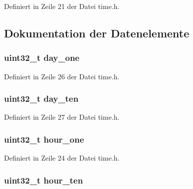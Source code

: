 Definiert in Zeile 21 der Datei time.\+h.



\subsection{Dokumentation der Datenelemente}
\hypertarget{structtime__date_aa49ac5f823611c03f3c3723f12047cfc}{}
\subsubsection[{day\+\_\+one}]{\setlength{\rightskip}{0pt plus 5cm}uint32\+\_\+t day\+\_\+one}\label{structtime__date_aa49ac5f823611c03f3c3723f12047cfc}


Definiert in Zeile 26 der Datei time.\+h.

\hypertarget{structtime__date_af252ce7a893acb93c32d07d0330f900d}{}
\subsubsection[{day\+\_\+ten}]{\setlength{\rightskip}{0pt plus 5cm}uint32\+\_\+t day\+\_\+ten}\label{structtime__date_af252ce7a893acb93c32d07d0330f900d}


Definiert in Zeile 27 der Datei time.\+h.

\hypertarget{structtime__date_a338fe5a5db873c63189f9c98bf0376fc}{}
\subsubsection[{hour\+\_\+one}]{\setlength{\rightskip}{0pt plus 5cm}uint32\+\_\+t hour\+\_\+one}\label{structtime__date_a338fe5a5db873c63189f9c98bf0376fc}


Definiert in Zeile 24 der Datei time.\+h.

\hypertarget{structtime__date_a7315167bc0969310bcaedee5699243e5}{}
\subsubsection[{hour\+\_\+ten}]{\setlength{\rightskip}{0pt plus 5cm}uint32\+\_\+t hour\+\_\+ten}\label{structtime__date_a7315167bc0969310bcaedee5699243e5}


